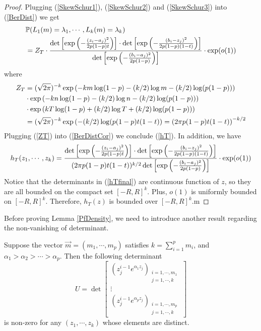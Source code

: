 \begin{proof}
	Plugging (\ref{SkewSchur1}), (\ref{SkewSchur2}) and (\ref{SkewSchur3}) into (\ref{BerDist}) we get
	\begin{equation}{\label{BerDistCor}}
		\begin{split}
			& \mathbb{P}(L_{1}(m)=\lambda_1,\cdots,L_k(m)=\lambda_k)\\
			& =Z_{T}\cdot \frac{\det\left[\exp\left(-\frac{(z_{i}-a_j)^2}{2p(1-p)t}\right)\right]\cdot\det\left[\exp\left(-\frac{(b_{i}-z_j)^2}{2p(1-p)(1-t)}\right)\right]}{\det\left[\exp\left(-\frac{(b_{i}-a_j)^2}{2p(1-p)}\right)\right]}\cdot \exp(o(1))
		\end{split}
	\end{equation}
	where 
	\begin{equation}{\label{ZT}}
		\begin{split}
			Z_{T}&=(\sqrt{2\pi})^{-k}\exp\left(-km\log(1-p)-(k/2)\log m-(k/2)\log(p(1-p))\right)\\
			&\cdot \exp\left(-kn\log(1-p)-(k/2)\log n-(k/2)\log(p(1-p))\right)\\
			& \cdot \exp\left(kT\log(1-p)+(k/2)\log T+(k/2)\log(p(1-p))\right)\\
			&=(\sqrt{2\pi})^{-k}\exp\left(-(k/2)\log(p(1-p)t(1-t) \right)=\left(2\pi p(1-p)t(1-t)\right)^{-k/2}
		\end{split}
	\end{equation}
	Plugging (\ref{ZT}) into (\ref{BerDistCor}) we conclude (\ref{hT}). In addition, we have
	\begin{equation}{\label{hTfinal}}
		\begin{split}
			h_{T}(z_1,\cdots,z_k)=\frac{\det\left[\exp\left(-\frac{(z_{i}-a_j)^2}{2p(1-p)t}\right)\right]\cdot\det\left[\exp\left(-\frac{(b_{i}-z_j)^2}{2p(1-p)(1-t)}\right)\right]}{(2\pi p(1-p)t(1-t))^{k/2}\det\left[\exp\left(-\frac{(b_{i}-a_j)^2}{2p(1-p)}\right)\right]}\cdot \exp(o(1))
		\end{split}
	\end{equation}
	Notice that the determinants in (\ref{hTfinal}) are continuous function of $z$, so they are all bounded on the compact set $[-R,R]^{k}$. Plus, $o(1)$ is uniformly bounded on $[-R,R]^{k}$. Therefore, $h_{T}(z)$ is bounded over $[-R,R]^k$.m
\end{proof}
Before proving Lemma \ref{PfDensity}, we need to introduce another result regarding the non-vanishing of determinant.

\begin{lemma}{\label{NonVanish}}
	Suppose the vector $\vec{m}=(m_1,\cdots,m_p)$ satisfies $k=\sum_{i=1}^{p}m_{i}$, and $\alpha_1>\alpha_2>\cdots>\alpha_p$. Then the following determinant
\[ U= \det
	\left[ \begin{array}{ccc}
		(z_{j}^{i-1}e^{\alpha_{1}z_{j}})_{\substack{i=1,\cdots,m_{1}\\j=1,\cdots,k}}\\
	\vdots\\
	(z_{j}^{i-1}e^{\alpha_{p}z_{j}})_{\substack{i=1,\cdots,m_{p}\\j=1,\cdots,k}}
	\end{array}
	\right]
\]
is non-zero for any $(z_{1},\cdots,z_{k})$ whose elements are distinct.
\end{lemma}

